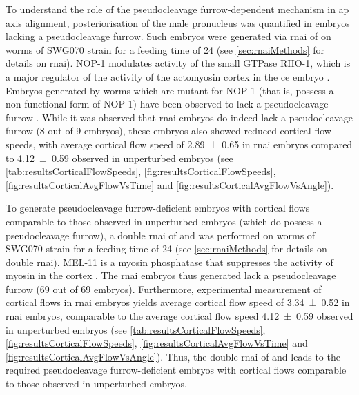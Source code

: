 To understand the role of the pseudocleavage furrow-dependent mechanism in \ac{ap} axis alignment, posteriorisation of the male pronucleus was quantified in embryos lacking a pseudocleavage furrow. Such embryos were generated via \ac{rnai} of  on worms of SWG070 strain for a feeding time of \SI{24}{\unitRNAiTime} (see \autoref{sec:rnaiMethods} for details on \ac{rnai}). NOP-1 modulates activity of the small GTPase RHO-1, which is a major regulator of the activity of the actomyosin cortex in the \ac{ce} embryo \citep{tse2012nop1}. Embryos generated by worms which are mutant for NOP-1 (that is, possess a non-functional form of NOP-1) have been observed to lack a pseudocleavage furrow \citep{rose1995pseudocleavage}. While it was observed that  \ac{rnai} embryos do indeed lack a pseudocleavage furrow (\num{8} out of \num{9} embryos), these embryos also showed reduced cortical flow speeds, with average cortical flow speed of \SI{2.89 +- 0.65}{\unitCrtxVel} in  \ac{rnai} embryos compared to \SI{4.12 +- 0.59}{\unitCrtxVel} observed in unperturbed embryos (see \autoref{tab:resultsCorticalFlowSpeeds}, \autoref{fig:resultsCorticalFlowSpeeds}, \autoref{fig:resultsCorticalAvgFlowVsTime} and \autoref{fig:resultsCorticalAvgFlowVsAngle}).

To generate pseudocleavage furrow-deficient embryos with cortical flows comparable to those observed in unperturbed embryos (which do possess a pseudocleavage furrow), a double \ac{rnai} of  and  was performed on worms of SWG070 strain for a feeding time of \SI{24}{\unitRNAiTime} (see \autoref{sec:rnaiMethods} for details on double \ac{rnai}). MEL-11 is a myosin phosphatase \citep{piekny2002rho} that suppresses the activity of myosin in the cortex \citep{najafabadi2022orchestrating}. The  \ac{rnai} embryos thus generated lack a pseudocleavage furrow (\num{69} out of \num{69} embryos). Furthermore, experimental measurement of cortical flows in  \ac{rnai} embryos yields average cortical flow speed of \SI{3.34 +- 0.52}{\unitCrtxVel} in  \ac{rnai} embryos, comparable to the average cortical flow speed \SI{4.12 +- 0.59}{\unitCrtxVel} observed in unperturbed embryos (see \autoref{tab:resultsCorticalFlowSpeeds}, \autoref{fig:resultsCorticalFlowSpeeds}, \autoref{fig:resultsCorticalAvgFlowVsTime} and \autoref{fig:resultsCorticalAvgFlowVsAngle}). Thus, the double \ac{rnai} of  and  leads to the required pseudocleavage furrow-deficient embryos with cortical flows comparable to those observed in unperturbed embryos.

